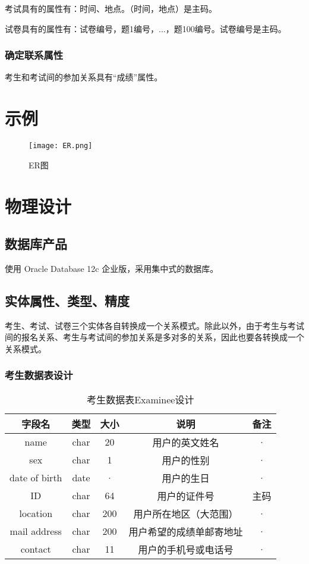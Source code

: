 考试具有的属性有：时间、地点。（时间，地点）是主码。

试卷具有的属性有：试卷编号，题1编号，...，题100编号。试卷编号是主码。

\subsubsection{确定联系属性}
考生和考试间的参加关系具有“成绩”属性。

\section{示例}
\begin{figure}[ht]
\centering
\texttt{[image: ER.png]}
\caption{ER图} \label{fig:figure1}
\end{figure}



\section{物理设计}

\subsection{数据库产品}
使用 Oracle Database 12c 企业版，采用集中式的数据库。

\subsection{实体属性、类型、精度}
考生、考试、试卷三个实体各自转换成一个关系模式。除此以外，由于考生与考试间的报名关系、考生与考试间的参加关系是多对多的关系，因此也要各转换成一个关系模式。
\subsubsection{考生数据表设计}
\begin{table}[htbp]
\centering
\caption{考生数据表Examinee设计} \label{tab:client-database}
\begin{tabular}{|c|c|c|c|c|}
    \hline
    字段名 & 类型 & 大小 & 说明 & 备注 \\
    \hline
    name & char & 20 & 用户的英文姓名 & · \\
    \hline
    sex & char & 1 & 用户的性别 & · \\
    \hline
    date of birth & date & · & 用户的生日 & · \\
    \hline
    ID & char & 64 & 用户的证件号 & 主码 \\
    \hline
    location & char & 200 & 用户所在地区（大范围） & · \\
    \hline
    mail address & char & 200 & 用户希望的成绩单邮寄地址 & · \\
    \hline
    contact & char & 11 & 用户的手机号或电话号 & · \\
    \hline
\end{tabular}
\end{table}

